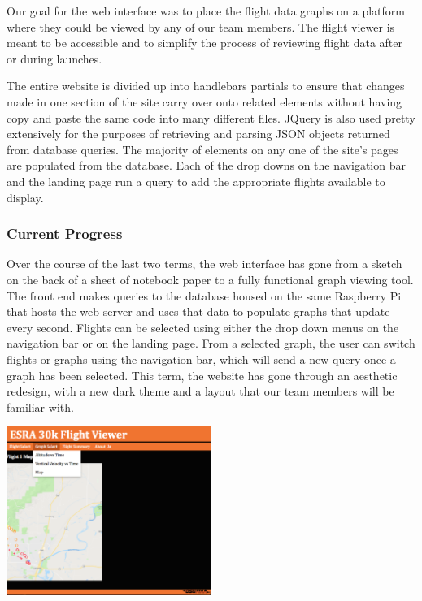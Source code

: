 \documentclass[onecolumn, draftclsnofoot, 10pt, compsoc]{IEEEtran}
\begin{document}
Our goal for the web interface was to place the flight data graphs on a platform where they could be viewed by any of our team members.
The flight viewer is meant to be accessible and to simplify the process of reviewing flight data after or during launches.

The entire website is divided up into handlebars partials to ensure that changes made in one section of the site carry over onto related elements without having copy and paste the same code into many different files.
JQuery is also used pretty extensively for the purposes of retrieving and parsing JSON objects returned from database queries.
The majority of elements on any one of the site's pages are populated from the database. Each of the drop downs on the navigation bar and the landing page run a query to add the appropriate flights available to display.

\subsubsection{Current Progress}
Over the course of the last two terms, the web interface has gone from a sketch on the back of a sheet of notebook paper to a fully functional graph viewing tool. The front end makes queries to the database housed on the same Raspberry Pi that hosts the web server and uses that data to populate graphs that update every second. Flights can be selected using either the drop down menus on the navigation bar or on the landing page. From a selected graph, the user can switch flights or graphs using the navigation bar, which will send a new query once a graph has been selected. This term, the website has gone through an aesthetic redesign, with a new dark theme and a layout that our team members will be familiar with.

\begin{center}
	\includegraphics[width=0.5\textwidth]{images/smallMap.eps}
    \label{map}
\end{center}
\end{document}
